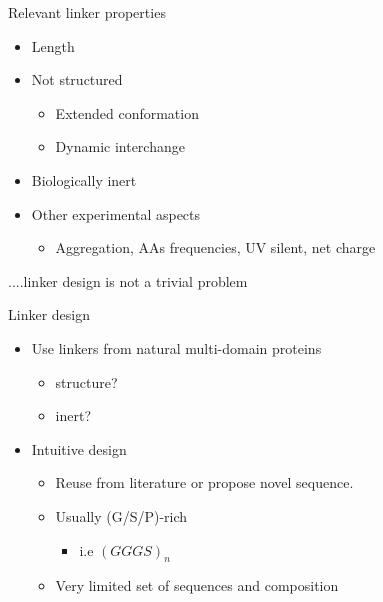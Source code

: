 \documentclass{beamer}
\begin{document}
\begin{frame}{Relevant linker properties}
\begin{itemize}
  \item Length
  \item Not structured
    \begin{itemize}
    \item Extended conformation
    \item Dynamic interchange
    \end{itemize}
  \item Biologically inert
  \item Other experimental aspects
    \begin{itemize}
     \item Aggregation, AAs frequencies, UV silent, net charge
    \end{itemize}
\end{itemize}
\pause
\vspace{15px}
\Large{....linker design is not a trivial problem}
\end{frame}



\begin{frame}{Linker design}
\begin{itemize}
 \item Use linkers from natural multi-domain proteins
 \pause
 \begin{itemize}
  \item structure?
  \item inert?

 \pause 
 \end{itemize}
 \item Intuitive design
 \pause
 \begin{itemize}
  \item Reuse from literature or propose novel sequence. 
  \item Usually (G/S/P)-rich 
  \begin{itemize}
   \item  i.e $(GGGS)_n$ 
  \end{itemize}
  \item Very limited set of sequences and composition
  \end{itemize}

\end{itemize}
\end{frame}
\end{document}
